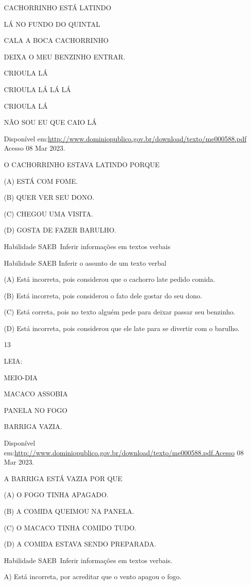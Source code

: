 {{{{{{CACHORRINHO ESTÁ LATINDO

LÁ NO FUNDO DO QUINTAL

CALA A BOCA CACHORRINHO

DEIXA O MEU BENZINHO ENTRAR.

CRIOULA LÁ

CRIOULA LÁ LÁ LÁ

CRIOULA LÁ

NÃO SOU EU QUE CAIO LÁ

Disponível
em:\url{http://www.dominiopublico.gov.br/download/texto/me000588.pdf}
Acesso 08 Mar 2023.

O CACHORRINHO ESTAVA LATINDO PORQUE

(A) ESTÁ COM FOME.

(B) QUER VER SEU DONO.

(C) CHEGOU UMA VISITA.

(D) GOSTA DE FAZER BARULHO.

Habilidade SAEB~Inferir informações em textos verbais

Habilidade SAEB Inferir o assunto de um texto verbal

(A) Está incorreta, pois considerou que o cachorro late pedido comida.

(B) Está incorreta, pois considerou o fato dele gostar do seu dono.

(C) Está correta, pois no texto alguém pede para deixar passar seu
benzinho.

(D) Está incorreta, pois considerou que ele late para se divertir com o
barulho.

\num{13}

LEIA:

MEIO-DIA

MACACO ASSOBIA

PANELA NO FOGO

BARRIGA VAZIA.

Disponível
em:\url{http://www.dominiopublico.gov.br/download/texto/me000588.pdf.Acesso}
08 Mar 2023.

A BARRIGA ESTÁ VAZIA POR QUE

(A) O FOGO TINHA APAGADO.

(B) A COMIDA QUEIMOU NA PANELA.

(C) O MACACO TINHA COMIDO TUDO.

(D) A COMIDA ESTAVA SENDO PREPARADA.

Habilidade SAEB~Inferir informações em textos verbais.

A) Está incorreta, por acreditar que o vento apagou o fogo.

}}}}}}
